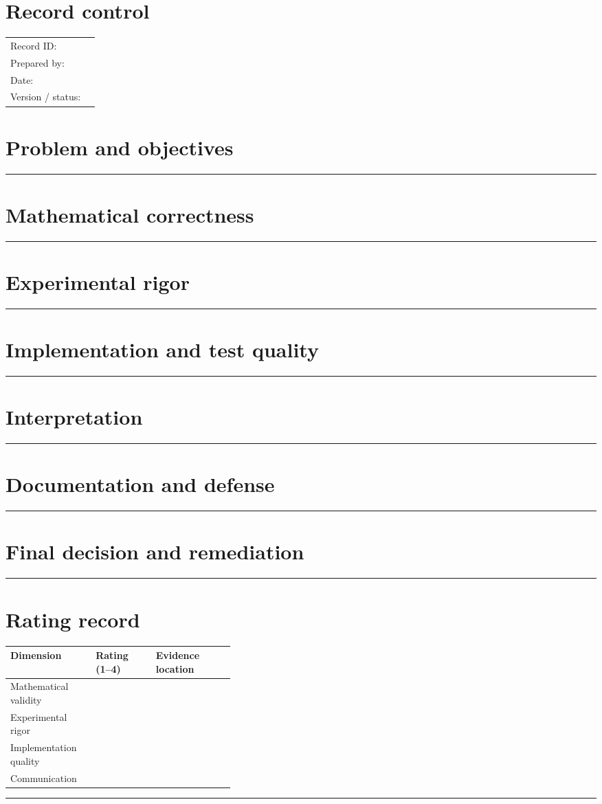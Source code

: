 \documentclass[11pt]{article}
\begin{document}
\makedoctitle
\section{Record control}
\begin{tabularx}{\linewidth}{@{}lX@{}}Record ID: & \hrulefill \\ Prepared by: & \hrulefill \\ Date: & \hrulefill \\ Version / status: & \hrulefill \\\end{tabularx}
\section{Problem and objectives}
\vspace{1.75cm}\hrule\vspace{0.35cm}
\section{Mathematical correctness}
\vspace{1.75cm}\hrule\vspace{0.35cm}
\section{Experimental rigor}
\vspace{1.75cm}\hrule\vspace{0.35cm}
\section{Implementation and test quality}
\vspace{1.75cm}\hrule\vspace{0.35cm}
\section{Interpretation}
\vspace{1.75cm}\hrule\vspace{0.35cm}
\section{Documentation and defense}
\vspace{1.75cm}\hrule\vspace{0.35cm}
\section{Final decision and remediation}
\vspace{1.75cm}\hrule\vspace{0.35cm}
\section{Rating record}\begin{tabularx}{\linewidth}{p{0.38\linewidth}XX}\toprule Dimension & Rating (1--4) & Evidence location \\ \midrule
Mathematical validity & & \\ Experimental rigor & & \\ Implementation quality & & \\ Communication & & \\ \bottomrule\end{tabularx}
\vspace{1cm}\hrule
\end{document}
